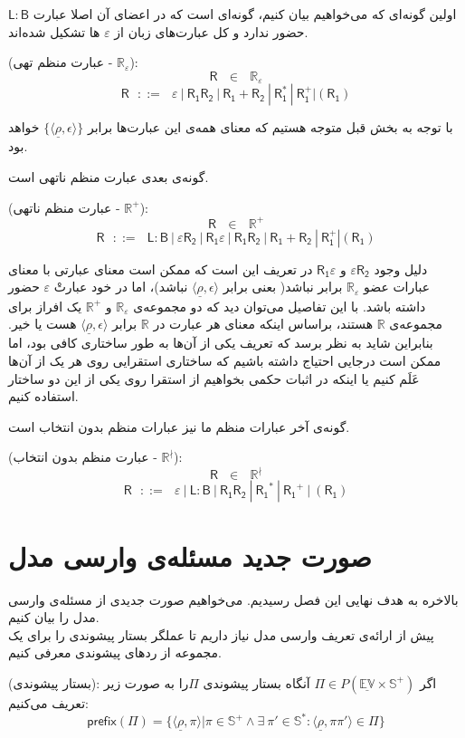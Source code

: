 اولین گونه‌ای که می‌خواهیم بیان کنیم، گونه‌ای است که در اعضای آن اصلا عبارت 
$\mathsf{L : B}$
حضور ندارد و کل عبارت‌های زبان از $\varepsilon$ ها تشکیل شده‌اند.
\begin{defn}
	(عبارت منظم تهی - $\mathbb{R_\varepsilon}$): 
	$$\mathsf{R} \:\:\:\in\:\:\: \mathbb{R}_\varepsilon$$
	$$\mathsf{R}\:\:\: ::= \:\:\: \varepsilon \: | \: \mathsf{R_1 R_2} \: | 
	\: \mathsf{R_1 + R_2} \: | \: \mathsf{R_1^*} \: | \: \mathsf{R_1^+} | (\mathsf{R_1})$$
\end{defn}


 با توجه به بخش قبل متوجه هستیم که معنای همه‌ی این عبارت‌ها برابر 
$\{\langle \underline{\rho} , \epsilon \rangle\}$
خواهد بود.

گونه‌ی بعدی عبارت منظم ناتهی است.
\begin{defn}
	(عبارت منظم ناتهی - $\mathbb{R}^+$):
	$$\mathsf{R} \:\:\:\in\:\:\: \mathbb{R}^+$$
	$$\mathsf{R}\:\:\: ::= \:\:\: \mathsf{L:B} \: |
	\: \mathsf{\varepsilon R_2} \: | \: \mathsf{R_1 \varepsilon} \: |
	\: \mathsf{R_1 R_2} \: | 
	\: \mathsf{R_1 + R_2} \: | \: \mathsf{R_1^+} | (\mathsf{R_1})$$
\end{defn}
دلیل وجود 
$\mathsf{\varepsilon R_2}$
و 
$\mathsf{R_1 \varepsilon}$
در تعریف این است که ممکن است معنای عبارتی با معنای عبارات عضو $\mathbb{R}_\varepsilon$ برابر نباشد( بعنی برابر ${\langle \underline{\rho} , \epsilon \rangle}$ نباشد)، اما در خود عبارتْ $\varepsilon$ حضور داشته باشد. با این تفاصیل می‌توان دید که دو مجموعه‌ی 
$\mathbb{R}_\varepsilon$
و
$\mathbb{R}^+$
یک افراز برای مجموعه‌ی $\mathbb{R}$ هستند، براساس اینکه معنای هر عبارت در $\mathbb{R}$ برابر ${\langle \underline{\rho} , \epsilon \rangle}$ هست یا خیر. بنابراین شاید به نظر برسد که تعریف یکی از آن‌ها به طور ساختاری کافی بود، اما ممکن است درجایی احتیاج داشته باشیم که ساختاری استقرایی روی هر یک از آن‌ها عَلَم کنیم یا اینکه در اثبات حکمی بخواهیم از استقرا روی یکی از این دو ساختار استفاده کنیم.

گونه‌ی آخر عبارات منظم ما نیز عبارات منظم بدون انتخاب است.
\begin{defn}
(عبارت منظم بدون انتخاب - $\mathbb{R}^\nmid$):
$$
\mathsf{R}\:\:\: \in \:\:\: \mathbb{R}^\nmid$$
$$
\mathsf{R}\:\:\: ::= \:\:\: \varepsilon \: | \: \mathsf{L:B} \: | \:
\mathsf{R_1 R_2} \: | \: \mathsf{R_1}^* \: | \: \mathsf{R_1}^+ \: | \:
(\mathsf{R_1})$$
\end{defn}

\section{صورت جدید مسئله‌ی وارسی مدل}
بالاخره به هدف نهایی این فصل رسیدیم. می‌خواهیم صورت جدیدی از مسئله‌ی وارسی مدل را بیان ‌کنیم.\\
پیش از ارائه‌ی تعریف وارسی مدل نیاز داریم تا عملگر بستار پیشوندی را برای یک مجموعه از ردهای پیشوندی معرفی کنیم.
\begin{defn}
	(بستار پیشوندی):
	اگر 
	$\Pi \in \mathit{P}(\mathbb{\underline{EV}\times S^+})$
	آنگاه بستار پیشوندی $\Pi$را به صورت زیر تعریف می‌کنیم:
	$$\mathsf{prefix}(\Pi)=
	\{\langle \underline{\rho},\pi\rangle | \pi \in \mathbb{S^+} \land \exists\
	\pi' \in \mathbb{S^*}: \langle \underline{\rho}, \pi \pi' \rangle \in \Pi \}$$
\end{defn}

